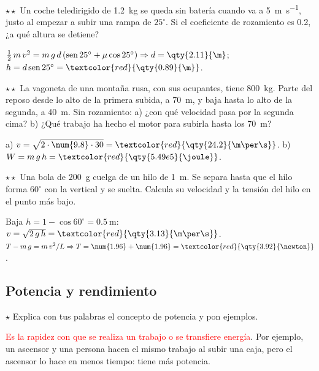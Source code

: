 \begin{exercise}
    \(\star\star\) Un coche teledirigido de \qty{1.2}{\kg} se queda sin batería cuando va a \qty{5}{\m\per\s}, justo al empezar a subir
    una rampa de \(25^\circ\). Si el coeficiente de rozamiento es \num{0.2}, ¿a qué altura se detiene?
    \begin{solu}
        \(\frac{1}{2}\,m\,v^2 = m\,g\,d\,(\sen 25^\circ + \mu\cos 25^\circ) \Rightarrow d = \qty{2.11}{\m}\);
        \(h = d\sen 25^\circ = \textcolor{red}{\qty{0.89}{\m}}\).
    \end{solu}
\end{exercise}

\begin{exercise}
    \(\star\star\) La vagoneta de una montaña rusa, con sus ocupantes, tiene \qty{800}{\kg}. Parte del reposo desde lo alto de la
    primera subida, a \qty{70}{\m}, y baja hasta lo alto de la segunda, a \qty{40}{\m}. Sin rozamiento: a) ¿con qué velocidad pasa por
    la segunda cima? b) ¿Qué trabajo ha hecho el motor para subirla hasta los \qty{70}{\m}?
    \begin{solu}
        a) \(v = \sqrt{2 \cdot \num{9.8} \cdot 30} = \textcolor{red}{\qty{24.2}{\m\per\s}}\). b) \(W = m\,g\,h = \textcolor{red}{\qty{5.49e5}{\joule}}\).
    \end{solu}
\end{exercise}

\begin{exercise}
    \(\star\star\) Una bola de \qty{200}{\g} cuelga de un hilo de \qty{1}{\m}. Se separa hasta que el hilo forma \(60^\circ\) con la
    vertical y se suelta. Calcula su velocidad y la tensión del hilo en el punto más bajo.
    \begin{solu}
        Baja \(h = 1 - \cos 60^\circ = \qty{0.5}{\m}\): \(v = \sqrt{2\,g\,h} = \textcolor{red}{\qty{3.13}{\m\per\s}}\).
        \(T - m\,g = m\,v^2/L \Rightarrow T = \num{1.96} + \num{1.96} = \textcolor{red}{\qty{3.92}{\newton}}\).
    \end{solu}
\end{exercise}

\subsection{Potencia y rendimiento}

\begin{exercise}
    \(\star\) Explica con tus palabras el concepto de potencia y pon ejemplos.
    \begin{solu}
        \textcolor{red}{Es la rapidez con que se realiza un trabajo o se transfiere energía}. Por ejemplo, un ascensor y una persona
        hacen el mismo trabajo al subir una caja, pero el ascensor lo hace en menos tiempo: tiene más potencia.
    \end{solu}
\end{exercise}

